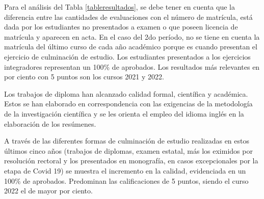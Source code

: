 Para el análisis del Tabla \ref{tableresultados}, se debe tener en cuenta que la diferencia entre las cantidades de evaluaciones con el número de matrícula, está dada por los estudiantes no presentados a examen o que poseen licencia de matrícula y aparecen en acta. En el caso del 2do período, no se tiene en cuenta la matrícula del último curso de cada año académico porque es cuando presentan el ejercicio de culminación de estudio. Los estudiantes presentados a los ejercicios integradores representan un 100\% de aprobados. Los resultados más relevantes en por ciento con 5 puntos son los cursos 2021 y 2022.

Los trabajos de diploma han alcanzado calidad formal, científica y académica. Estos se han elaborado en correspondencia con las exigencias de la metodología de la investigación científica y se les orienta el empleo del idioma inglés en la elaboración de los resúmenes. 

A través de las diferentes formas de culminación de estudio realizadas en estos últimos cinco años (trabajos de diplomas, examen estatal, más los eximidos por resolución rectoral y los presentados en monografía, en casos excepcionales por la etapa de Covid 19) se muestra el incremento en la calidad, evidenciada en un 100\% de aprobados. Predominan las calificaciones de 5 puntos, siendo el curso 2022 el de mayor por ciento.

